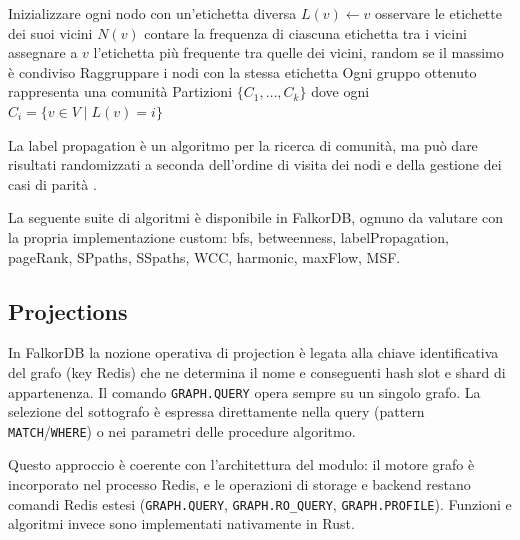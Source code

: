 \documentclass{article}
\begin{document}
\begin{algorithm}
\caption{Label Propagation}
\begin{algorithmic}[1]
    \State Inizializzare ogni nodo con un'etichetta diversa $L(v) \leftarrow v$
    \Repeat
            \State \quad osservare le etichette dei suoi vicini $N(v)$
            \State \quad contare la frequenza di ciascuna etichetta tra i vicini
            \State \quad assegnare a $v$ l'etichetta più frequente tra quelle dei vicini, random se il massimo è condiviso
        \EndFor
    \State Raggruppare i nodi con la stessa etichetta
    \State Ogni gruppo ottenuto rappresenta una comunità
    \State \Return Partizioni $\{ C_1, \dots, C_k \}$ dove ogni $C_i = \{ v \in V \mid L(v) = i \}$
\EndProcedure
\end{algorithmic}
\end{algorithm}



La label propagation è un algoritmo per la ricerca di comunità, ma può dare risultati randomizzati %
a seconda dell'ordine di visita dei nodi e della gestione dei casi di parità \cite{Wiki-LabelPropagation}. %

La seguente suite di algoritmi è disponibile in FalkorDB, %
ognuno da valutare con la propria implementazione custom: bfs, betweenness, %
labelPropagation, pageRank, SPpaths, SSpaths, WCC, harmonic, maxFlow, MSF.



\subsection{Projections}
In FalkorDB la nozione operativa di projection è legata alla chiave identificativa del grafo (key %
Redis) che ne determina il nome e conseguenti hash slot e shard di appartenenza. %
Il comando \texttt{GRAPH.QUERY} opera sempre su un singolo grafo.
La selezione del sottografo è espressa direttamente nella query %
(pattern \texttt{MATCH}/\texttt{WHERE}) o nei parametri delle procedure algoritmo.


Questo approccio è coerente con l'architettura del modulo: il motore grafo %
è incorporato nel processo Redis, %
e le operazioni di storage e backend restano comandi Redis %
estesi (\texttt{GRAPH.QUERY}, \texttt{GRAPH.RO\_QUERY}, \texttt{GRAPH.PROFILE}).
Funzioni e algoritmi invece sono implementati nativamente in Rust.
\end{document}
